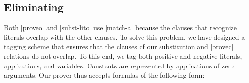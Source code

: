 \subsection{Eliminating \matchasymbol}\label{matcha}

Both \scheme|proveo| and \scheme|subst-lito| use \scheme|match-a|
because the clauses that recognize literals overlap with the other
clauses. To solve this problem, we have designed a tagging scheme that
ensures that the clauses of our substitution and \scheme|proveo|
relations do not overlap.  To this end, we tag both positive and
negative literals, applications, and variables. Constants are
represented by applications of zero arguments. Our prover thus accepts
formulas of the following form:





